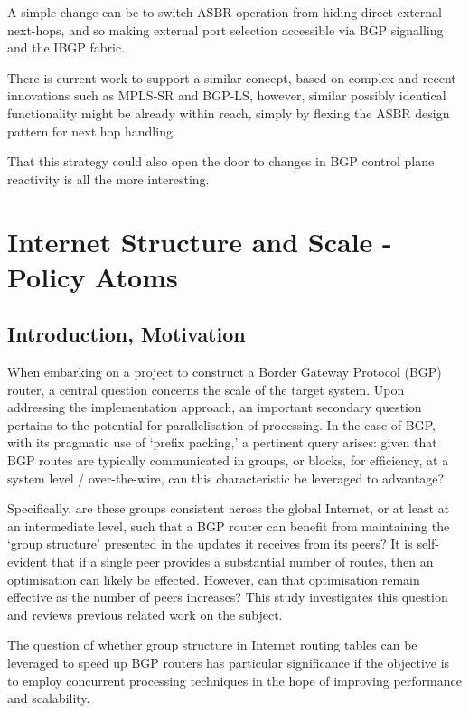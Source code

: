 A simple change can be to switch ASBR operation from hiding direct external next-hops, and so making external port selection accessible via BGP signalling and the IBGP fabric.

There is current work to support a similar concept, based on complex and recent innovations such as MPLS-SR and BGP-LS, however, similar possibly identical functionality might be already within reach, simply by flexing the ASBR design pattern for next hop handling.

\medskip

That this strategy could also open the door to changes in BGP control plane reactivity is all the more interesting.


\section{Internet Structure and Scale - Policy Atoms}

\subsection{Introduction, Motivation}

When embarking on a project to construct a Border Gateway Protocol (BGP) router, a central question concerns the scale of the target system. Upon addressing the implementation approach, an important secondary question pertains to the potential for parallelisation of processing. In the case of BGP, with its pragmatic use of `prefix packing,' a pertinent query arises: given that BGP routes are typically communicated in groups, or blocks, for efficiency, at a system level / over-the-wire, can this characteristic be leveraged to advantage?

Specifically, are these groups consistent across the global Internet, or at least at an intermediate level, such that a BGP router can benefit from maintaining the `group structure' presented in the updates it receives from its peers? It is self-evident that if a single peer provides a substantial number of routes, then an optimisation can likely be effected. However, can that optimisation remain effective as the number of peers increases? This study investigates this question and reviews previous related work on the subject.

\medskip

The question of whether group structure in Internet routing tables can be leveraged to speed up BGP routers has particular significance if the objective is to employ concurrent processing techniques in the hope of improving performance and scalability.

